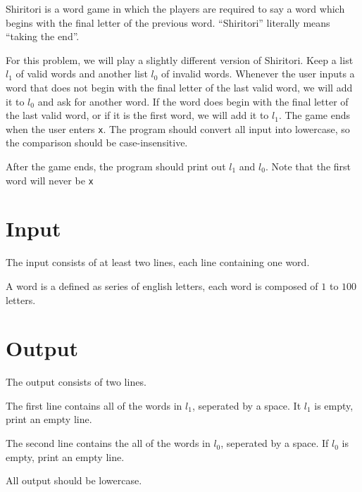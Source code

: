 

Shiritori
is a word game
in which the players are required to say a word
which begins with the final letter of the previous word.
``Shiritori'' literally means ``taking the end''.

For this problem, we will play a slightly different version of Shiritori.
Keep a list $l_1$ of valid words and another list $l_0$ of invalid words.
Whenever the user inputs a word
that does not begin with the final letter of the last valid word,
we will add it to $l_0$ and ask for another word.
If the word does begin with the final letter of the last valid word,
or if it is the first word,
we will add it to $l_1$.
The game ends when the user enters \texttt{x}.
The program should convert all input into lowercase,
so the comparison should be case-insensitive.

After the game ends,
the program should print out $l_1$ and $l_0$.
Note that the first word will never be \texttt{x}

\section*{Input}

The input consists of at least two lines, each line containing one word.

A word is a defined as series of english letters,
each word is composed of $1$ to $100$ letters.

\section*{Output}

The output consists of two lines.

The first line contains all of the words in $l_1$, seperated by a space.
It $l_1$ is empty, print an empty line.

The second line contains the all of the words in $l_0$, seperated by a space.
If $l_0$ is empty, print an empty line.

All output should be lowercase.
